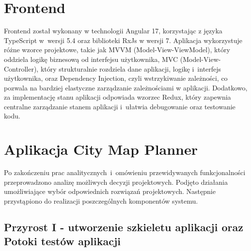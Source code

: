 \section{Frontend}
Frontend został wykonany w technologii Angular 17, korzystając z języka TypeScript w~wersji 5.4 oraz biblioteki RxJs w wersji 7.
Aplikacja wykorzystuje różne wzorce projektowe, takie jak MVVM (Model-View-ViewModel), który oddziela logikę biznesową od interfejsu użytkownika, MVC (Model-View-Controller), który strukturalnie rozdziela dane aplikacji, logikę i~interfejs użytkownika, oraz Dependency Injection, czyli wstrzykiwanie zależności, co pozwala na bardziej elastyczne zarządzanie zależnościami w aplikacji.
Dodatkowo, za implementację stanu aplikacji odpowiada wzorzec Redux, który zapewnia centralne zarządzanie stanem aplikacji i~ułatwia debugowanie oraz testowanie kodu.


\section{Aplikacja City Map Planner}
\label{sec:aplikacja}

Po zakończeniu prac analitycznych~i~omówieniu przewidywanych funkcjonalności przeprowadzono analizę możliwych decyzji projektowych. 
Podjęto działania umożliwiające wybór odpowiednich rozwiązań projektowych. 
Następnie przystąpiono do realizacji poszczególnych komponentów systemu.

\subsection{Przyrost I - utworzenie szkieletu aplikacji oraz Potoki testów aplikacji}
\label{sec:przyrost1}

